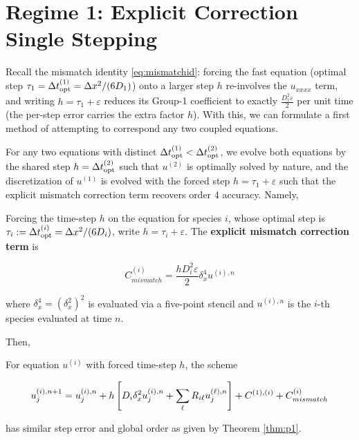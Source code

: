 \section{Regime 1: Explicit Correction Single Stepping}\label{sec:regime1}

Recall the mismatch identity \eqref{eq:mismatchid}: forcing the fast equation (optimal step $\tau_1=\Delta t_{\mathrm{opt}}^{(1)}=\Delta x^2/(6D_1)$) onto a larger step $h$ re-involves the $u_{xxxx}$ term, and writing $h = \tau_1 + \varepsilon$ reduces its Group-1 coefficient to exactly $\frac{D_1^2\varepsilon}{2}$ per unit time (the per-step error carries the extra factor $h$). With this, we can formulate a first method of attempting to correspond any two coupled equations. 

For any two equations with distinct $\Delta t_{\mathrm{opt}}^{(1)} < \Delta t_{\mathrm{opt}}^{(2)}$, we evolve both equations by the shared step $h = \Delta t_{\mathrm{opt}}^{(2)}$ such that $u^{(2)}$ is optimally solved by nature, and the discretization of $u^{(1)}$ is evolved with the forced step $h = \tau_1 + \varepsilon$ such that the explicit mismatch correction term recovers order 4 accuracy. Namely,

\begin{lemma}\label{thm:mismatch}
  Forcing the time-step $h$ on the equation for species $i$, whose optimal step is $\tau_i:=\Delta t_{\mathrm{opt}}^{(i)}=\Delta x^2/(6D_i)$, write $h = \tau_i + \varepsilon$. The \textbf{explicit mismatch correction term} is

  \[
    C^{(i)}_{mismatch} = \frac{h D_i^2 \varepsilon}2 \delta_x^4 u^{(i), n}
  \]

  where $\delta_x^4=(\delta_x^2)^2$ is evaluated via a five-point stencil and $u^{(i), n}$ is the $i$-th species evaluated at time $n$.
\end{lemma}

Then,

\begin{theorem}\label{thm:cpl-r1-p1}
  For equation $u^{(i)}$ with forced time-step $h$, the scheme

  \begin{equation}\label{eq:coupledscheme1}
      u^{(i), n+1}_{j} = u^{(i), n}_{j} + h \left[ D_i \delta_x^2 u^{(i), n}_{j} + \sum_{\ell} R_{i\ell} u^{(\ell), n}_{j} \right] + C^{(1), (i)} + C^{(i)}_{mismatch}  
  \end{equation}

  has similar step error and global order as given by Theorem \ref{thm:p1}.
\end{theorem}


